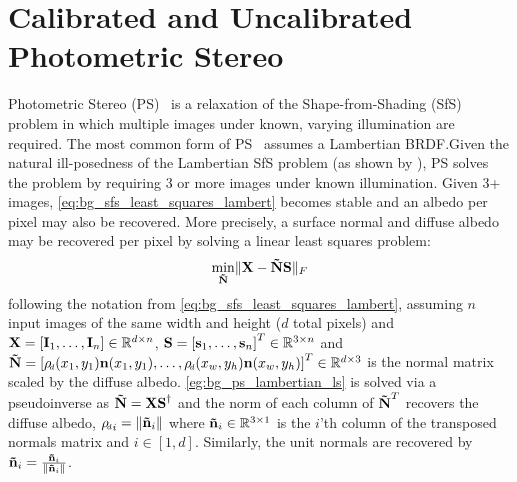 \section{Calibrated and Uncalibrated Photometric Stereo}\label{ch:bg_ps}
Photometric Stereo (PS)~\cite{woodham1980photometric} is a relaxation of the
Shape-from-Shading (SfS) problem in which multiple images under known, varying
illumination are required. The most common form of
PS~\cite{woodham1980photometric} assumes a Lambertian BRDF.\@ Given the natural
ill-posedness of the Lambertian SfS problem (as shown by
), PS solves the problem by requiring
3 or more images under known illumination. Given 3+ images,
\cref{eq:bg_sfs_least_squares_lambert} becomes stable and an albedo per pixel 
may also be recovered. More precisely, a surface normal and diffuse albedo
may be recovered per pixel by solving a linear least squares problem:
\begin{equation}\label{eg:bg_ps_lambertian_ls}
	 \min_{\boldsymbol{\mathbf{\tilde{N}}}} \lVert \boldsymbol{\mathbf{X}} - \boldsymbol{\mathbf{\tilde{N}}} \boldsymbol{\mathbf{S}} \rVert_F
\end{equation}
following the notation from \cref{eq:bg_sfs_least_squares_lambert},
assuming $n$ input images of the same width and height ($d$ total pixels) and
$\boldsymbol{\mathbf{X}} = [\boldsymbol{\mathbf{I}}_1, \ldots, \boldsymbol{\mathbf{I}}_n] \in \mathbb{R}^{d \times n}$, 
$\boldsymbol{\mathbf{S}} = {[\boldsymbol{\mathbf{s}}_1, \ldots, \boldsymbol{\mathbf{s}}_n]}^T \in \mathbb{R}^{3 \times n}$ and
$\bb{\tilde{N}} = \nobreak {[\rho_{\smallsub{d}}(x_1, y_1)\bb{n}(x_1, y_1), \ldots, \rho_{\smallsub{d}}(x_w, y_h)\bb{n}(x_w, y_h)]}^T \in \R^{d \times 3}$ is the normal matrix scaled by the diffuse
albedo. \cref{eg:bg_ps_lambertian_ls} is solved via a
pseudoinverse as $\boldsymbol{\mathbf{\tilde{N}}} = \boldsymbol{\mathbf{X}} \boldsymbol{\mathbf{S}}^{\dagger}$ and the norm of each
column of $\boldsymbol{\mathbf{\tilde{N}}}^T$ recovers the diffuse albedo,
${\rho_{\smallsub{d}}}_i = \norm{\bb{\tilde{n}}_i}$ 
where $\boldsymbol{\mathbf{\tilde{n}}}_i \in \mathbb{R}^{3 \times 1}$
is the $i$'th column of the transposed normals matrix and $i \in [1, d]$. 
Similarly, the unit normals are recovered by
$\boldsymbol{\mathbf{\tilde{n}}}_i = \frac{\boldsymbol{\mathbf{\tilde{n}}}_i}{\lVert{} \boldsymbol{\mathbf{\tilde{n}}}_i \rVert}$.

